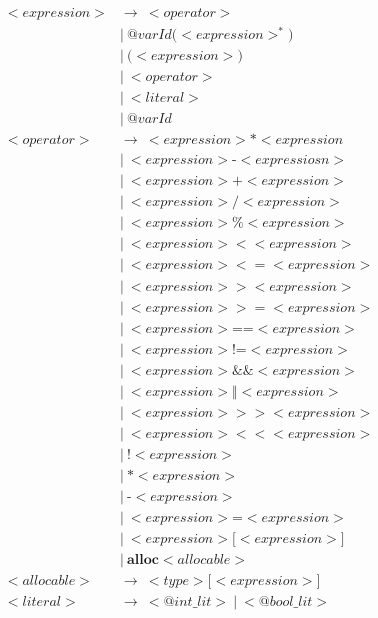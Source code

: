 \documentclass{article}
\begin{document}
\begin{align*}
<expression> &\longrightarrow \ <operator>\\
    &| \ \textit{@varId} \textbf{(} <expression>^* \textbf{)} \\
    &| \ \textbf{(} <expression> \textbf{)} \\
    &| \ <operator> \\
    &| \ <literal> \\
    &| \ \textit{@varId} \\
<operator> &\longrightarrow \ <expression> \textbf{*} <expression \\
    &| \ <expression> \textbf{-} <expressiosn> \\
    &| \ <expression> \textbf{+} <expression> \\
    &| \ <expression> \textbf{/} <expression> \\
    &| \ <expression> \textbf{\%} <expression> \\
    &| \ <expression> \textbf{$<$} <expression> \\
    &| \ <expression> \textbf{$<=$} <expression> \\
    &| \ <expression> \textbf{$>$} <expression> \\
    &| \ <expression> \textbf{$>=$} <expression> \\
    &| \ <expression> \textbf{==} <expression> \\
    &| \ <expression> \textbf{!=} <expression> \\
    &| \ <expression> \textbf{\&\& } <expression> \\
    &| \ <expression> \textbf{$\Vert$} <expression> \\
    &| \ <expression> \textbf{$>>$} <expression> \\
    &| \ <expression> \textbf{$<<$} <expression> \\
    &| \ \textbf{!} <expression> \\
    &| \ \textbf{*} <expression> \\
    &| \ \textbf{-} <expression> \\
    &| \ <expression> \textbf{=} <expression> \\
    &| \ <expression> \textbf{[} <expression> \textbf{]} \\
    &| \ \textbf{alloc} <allocable> \\
<allocable> &\longrightarrow \ <type> \textbf{[} <expression> \textbf{]} \\
<literal> &\longrightarrow \ <@int\_lit> \ | \ <@bool\_lit> \\
\end{align*}
\end{document}
